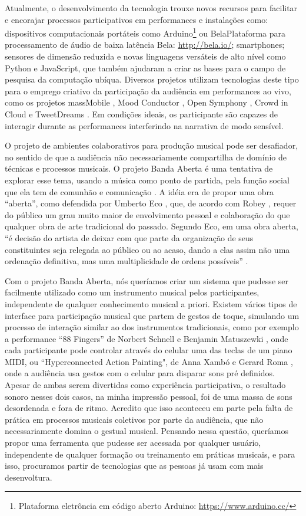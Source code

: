 Atualmente, o desenvolvimento da tecnologia trouxe novos recursos para facilitar e encorajar processos participativos em performances e instalações como: dispositivos computacionais portáteis como Arduino\footnote{Plataforma eletrôncia em código aberto Arduino: \url{https://www.arduino.cc/}} ou Bela{Plataforma para processamento de áudio de baixa latência Bela: \url{http://bela.io/}}; smartphones; sensores de dimensão reduzida e novas linguagens versáteis de alto nível como Python e JavaScript, que também ajudaram a criar as bases para o campo de pesquisa da computação ubíqua. Diversos projetos utilizam tecnologias deste tipo para o emprego criativo da participação da audiência em performances ao vivo, como os projetos massMobile \cite{Weitzner2012}, Mood Conductor \cite{Fazekas:2014}, Open Symphony \cite{wu2017open}, Crowd in Cloud \cite{Lee2016} e TweetDreams \cite{Dahl2011}. Em condições ideais, os participante são capazes de interagir durante as performances interferindo na narrativa de modo sensível. 

O projeto de ambientes colaborativos para produção musical pode ser desafiador, no sentido de que a audiência não necessariamente compartilha de domínio de técnicas e processos musicais. O projeto Banda Aberta é uma tentativa de explorar esse tema, usando a música como ponto de partida, pela função social que ela tem de comunhão e comunicação \cite{Koelsch:2014}. A idéia era de propor uma obra ``aberta'', como defendida por Umberto Eco \cite{Eco1991}, que, de acordo com Robey \cite{Eco1991}, requer do público um grau muito maior de envolvimento pessoal e colaboração do que qualquer obra de arte tradicional do passado. Segundo Eco, em uma obra aberta, ``é decisão do artista de deixar com que parte da organização de seus constituintes seja relegada ao público ou ao acaso, dando a elas assim não uma ordenação definitiva, mas uma multiplicidade de ordens possíveis'' \cite{Eco1991}.

Com o projeto Banda Aberta, nós queríamos criar um sistema que pudesse ser facilmente utilizado como um instrumento musical pelos participantes, independente de qualquer conhecimento musical a priori. Existem vários tipos de interface para participação musical que partem de gestos de toque, simulando um processo de interação similar ao dos instrumentos tradicionais, como por exemplo a performance ``88 Fingers'' de Norbert Schnell e Benjamin Matuszewki \cite{Schnell2017}, onde cada participante pode controlar através do celular uma das teclas de um piano MIDI, ou ``Hyperconnected Action Painting", de Anna Xambó e Gerard Roma \cite{Xambo2017}, onde a audiência usa gestos com o celular para disparar sons pré definidos. Apesar de ambas serem divertidas como experiência participativa, o resultado sonoro nesses dois casos, na minha impressão pessoal, foi de uma massa de sons desordenada e fora de ritmo. Acredito que isso aconteceu em parte pela falta de prática em processos musicais coletivos por parte da audiência, que não necessariamente domina o gestual musical. Pensando nessa questão, queríamos propor uma ferramenta que pudesse ser acessada por qualquer usuário, independente de qualquer formação ou treinamento em práticas musicais, e para isso, procuramos partir de tecnologias que as pessoas já usam com mais desenvoltura.

